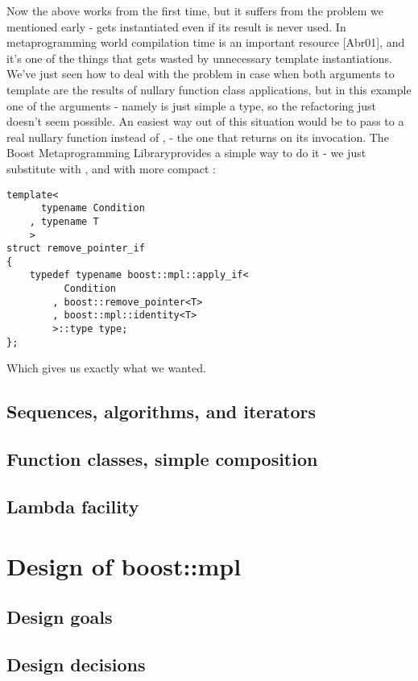 \documentclass{netobjectdays}
\newcommand{\Mpl}{Boost Meta\-program\-ming Library}
\begin{document}
Now the above works from the first time, but it suffers from the 
problem we mentioned early -  gets 
instantiated even if its result is never used. In metaprogramming 
world compilation time is an important resource [Abr01], and it's 
one of the things that gets wasted by unnecessary template 
instantiations. We've just seen how to deal with the problem in 
case when both arguments to  template are the 
results of nullary function class applications, but in this example 
one of the arguments - namely  is just simple a type, so 
the refactoring just doesn't seem possible. An easiest way out of 
this situation would be to pass to  a real 
nullary function instead of , - the one that returns 
 on its invocation. The \Mpl provides a simple way to do it -
we just substitute  with ,
and  with more compact 
:

{\footnotesize
\begin{verbatim}
template<
      typename Condition
    , typename T
    >
struct remove_pointer_if
{
    typedef typename boost::mpl::apply_if<
          Condition
        , boost::remove_pointer<T>
        , boost::mpl::identity<T>
        >::type type;
};
\end{verbatim}
}

Which gives us exactly what we wanted.

\subsection{Sequences, algorithms, and iterators}
\subsection{Function classes, simple composition}
\subsection{Lambda facility}

\section{Design of boost::mpl}
\subsection{Design goals}
\subsection{Design decisions}
\end{document}
